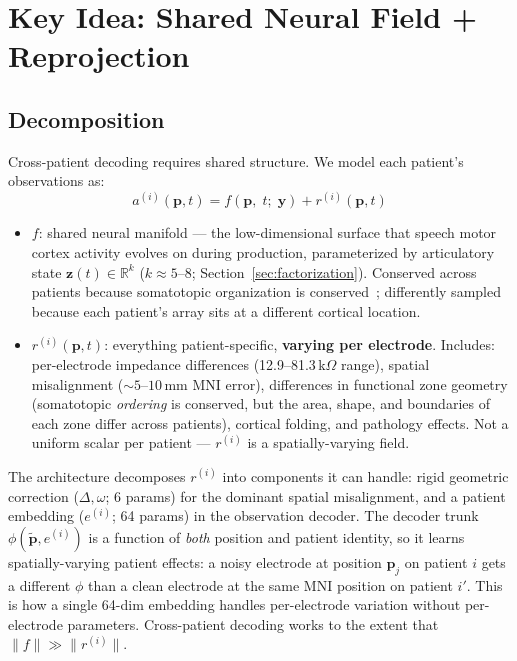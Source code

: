 \documentclass[11pt,letterpaper]{article}
\newcommand{\bfp}{\mathbf{p}}
\newcommand{\bfz}{\mathbf{z}}
\newcommand{\bfy}{\mathbf{y}}
\newcommand{\R}{\mathbb{R}}
\begin{document}

\section{Key Idea: Shared Neural Field + Reprojection}\label{sec:idea}

\subsection{Decomposition}

Cross-patient decoding requires shared structure. We model each patient's observations as:
\begin{equation}\label{eq:decomposition}
a^{(i)}(\bfp, t) = f(\bfp,\; t;\; \bfy) + r^{(i)}(\bfp, t)
\end{equation}
\begin{itemize}[leftmargin=2em]
\item $f$: shared neural manifold --- the low-dimensional surface that speech motor cortex activity evolves on during production, parameterized by articulatory state $\bfz(t) \in \R^k$ ($k {\approx} 5$--$8$; Section~\ref{sec:factorization}). Conserved across patients because somatotopic organization is conserved~\cite{safaie2023,gallego2020}; differently sampled because each patient's array sits at a different cortical location.
\item $r^{(i)}(\bfp, t)$: everything patient-specific, \textbf{varying per electrode}. Includes: per-electrode impedance differences (12.9--81.3\,k$\Omega$ range), spatial misalignment (${\sim}5$--$10$\,mm MNI error), differences in functional zone geometry (somatotopic \textit{ordering} is conserved, but the area, shape, and boundaries of each zone differ across patients), cortical folding, and pathology effects. Not a uniform scalar per patient --- $r^{(i)}$ is a spatially-varying field.
\end{itemize}
The architecture decomposes $r^{(i)}$ into components it can handle: rigid geometric correction ($\Delta, \omega$; 6 params) for the dominant spatial misalignment, and a patient embedding ($e^{(i)}$; 64 params) in the observation decoder. The decoder trunk $\phi(\tilde{\bfp}, e^{(i)})$ is a function of \textit{both} position and patient identity, so it learns spatially-varying patient effects: a noisy electrode at position $\bfp_j$ on patient $i$ gets a different $\phi$ than a clean electrode at the same MNI position on patient $i'$. This is how a single 64-dim embedding handles per-electrode variation without per-electrode parameters. Cross-patient decoding works to the extent that $\|f\| \gg \|r^{(i)}\|$.
\end{document}
